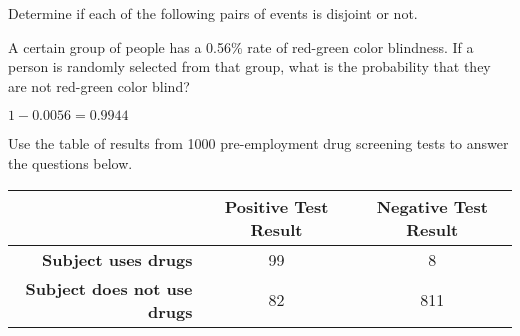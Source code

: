 \documentclass[addpoints]{exam}
\begin{document}
\bracketedpoints
\pointsinmargin
\begin{questions}
\question[3] Determine if each of the following pairs of events is disjoint or not.


\question[2]A certain group of people has a 0.56\% rate of red-green color blindness. If a person is randomly selected from that group, what is the probability that they are not red-green color blind?
\begin{solution}[\stretch{1}] $1-0.0056 = 0.9944$
\end{solution}

\question[6] Use the table of results from 1000 pre-employment drug screening tests to answer the questions below.

\begin{tabular} {|r|c|c|} \hline
& {\bfseries Positive Test Result} & {\bfseries Negative Test Result} \\ \hline
{\bfseries Subject uses drugs} & 99 & 8 \\ \hline
{\bfseries Subject does not use drugs} & 82 & 811\\ \hline
\end{tabular}


\end{questions}
\end{document}
